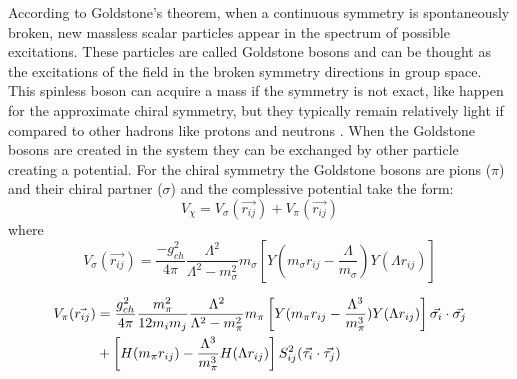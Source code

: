 \documentclass[12pt,a4paper]{book}
\begin{document}
	According to Goldstone's theorem, when a continuous symmetry is spontaneously broken, new massless scalar particles appear in the spectrum of possible excitations. These particles are called Goldstone bosons and can be thought as the excitations of the field in the broken symmetry directions in group space. This spinless boson can acquire a mass if the symmetry is not exact, like happen for the approximate chiral symmetry, but they typically remain relatively light if compared to other hadrons like protons and neutrons \cite{Smit_2023}. When the Goldstone bosons are created in the system they can be exchanged by other particle creating a potential. For the chiral symmetry the Goldstone bosons are pions ($\pi$) and their chiral partner ($\sigma$) and the complessive potential take the form:
	\begin{equation}
		V_\chi = V_\sigma(\vec{r_{ij}}) +V_\pi (\vec{r_{ij}})
	\end{equation}
	where 
	\begin{equation}
		V_\sigma(\vec{r_{ij}})= \frac{-g_{ch}^2}{4\pi} \frac{\Lambda^2}{\Lambda^2-m_\sigma^2} m_\sigma \left[ Y(m_\sigma r_{ij}- \frac{\Lambda}{m_\sigma}) Y(\Lambda r_{ij}) \right]
		\label{eq:sigma-potential}
	\end{equation}
	
	\begin{align}
		V_\pi(\vec{r_{ij}}) &= \frac{g_{ch}^2}{4\pi} \frac{m_\pi^2}{12 m_i m_j} \frac{\Lambda^2}{\Lambda^2 - m_\pi^2} m_\pi \left[ Y(m_\pi r_{ij} - \frac{\Lambda^3}{m_\pi^3}) Y(\Lambda r_{ij}) \right] \vec{\sigma_i} \cdot \vec{\sigma_j} \notag \\
		&+ \left[ H(m_\pi r_{ij}) - \frac{\Lambda^3}{m_\pi^3} H(\Lambda r_{ij}) \right] S_{ij}^2 (\vec{\tau_i} \cdot \vec{\tau_j})
		\label{eq:pi-potential}
	\end{align}
	
\end{document}
